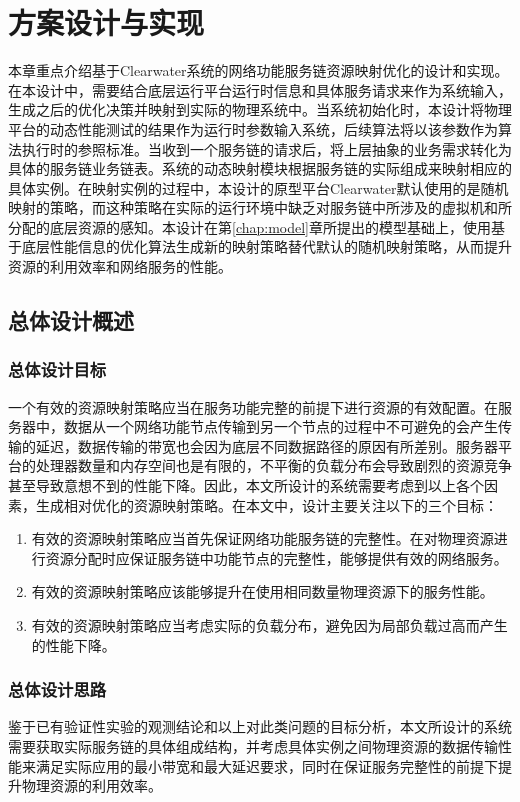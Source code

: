 \chapter{方案设计与实现}
\label{chap:design_implement}
本章重点介绍基于Clearwater系统的网络功能服务链资源映射优化的设计和实现。在本设计中，需要结合底层运行平台运行时信息和具体服务请求来作为系统输入，生成之后的优化决策并映射到实际的物理系统中。当系统初始化时，本设计将物理平台的动态性能测试的结果作为运行时参数输入系统，后续算法将以该参数作为算法执行时的参照标准。当收到一个服务链的请求后，将上层抽象的业务需求转化为具体的服务链业务链表。系统的动态映射模块根据服务链的实际组成来映射相应的具体实例。在映射实例的过程中，本设计的原型平台Clearwater默认使用的是随机映射的策略，而这种策略在实际的运行环境中缺乏对服务链中所涉及的虚拟机和所分配的底层资源的感知。本设计在第\ref{chap:model}章所提出的模型基础上，使用基于底层性能信息的优化算法生成新的映射策略替代默认的随机映射策略，从而提升资源的利用效率和网络服务的性能。

\section{总体设计概述}
\subsection{总体设计目标}
一个有效的资源映射策略应当在服务功能完整的前提下进行资源的有效配置。在服务器中，数据从一个网络功能节点传输到另一个节点的过程中不可避免的会产生传输的延迟，数据传输的带宽也会因为底层不同数据路径的原因有所差别。服务器平台的处理器数量和内存空间也是有限的，不平衡的负载分布会导致剧烈的资源竞争甚至导致意想不到的性能下降。因此，本文所设计的系统需要考虑到以上各个因素，生成相对优化的资源映射策略。在本文中，设计主要关注以下的三个目标：
\begin{enumerate}
	\item 有效的资源映射策略应当首先保证网络功能服务链的完整性。在对物理资源进行资源分配时应保证服务链中功能节点的完整性，能够提供有效的网络服务。
	\item 有效的资源映射策略应该能够提升在使用相同数量物理资源下的服务性能。
	\item 有效的资源映射策略应当考虑实际的负载分布，避免因为局部负载过高而产生的性能下降。
\end{enumerate}

\subsection{总体设计思路}
鉴于已有验证性实验的观测结论和以上对此类问题的目标分析，本文所设计的系统需要获取实际服务链的具体组成结构，并考虑具体实例之间物理资源的数据传输性能来满足实际应用的最小带宽和最大延迟要求，同时在保证服务完整性的前提下提升物理资源的利用效率。


